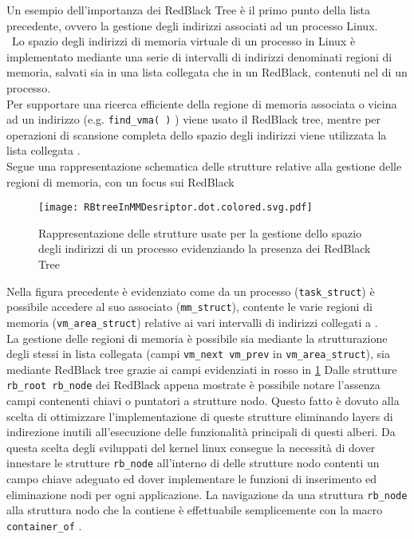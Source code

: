 \cite{lwnAgumentedRBtrees,lwnRBtrees}
\voidLine
\label{chSpMMAux:memRegionRBTree}
Un esempio dell'importanza dei RedBlack Tree è il primo punto della lista precedente,
ovvero la gestione degli indirizzi associati ad un processo Linux.\\\
Lo spazio degli indirizzi di memoria virtuale di un processo in Linux è implementato mediante una serie
di intervalli di indirizzi denominati regioni di memoria, salvati sia in una lista collegata che in un RedBlack, contenuti
nel \vvv{Memory Descriptor} di un processo.\\
Per supportare una ricerca efficiente della regione di memoria associata o vicina ad un indirizzo
(e.g. \verb|find_vma( )| ) viene usato il RedBlack tree, 
mentre per operazioni di scansione completa dello spazio degli indirizzi viene utilizzata la lista collegata
\cite{ulk}.\\
\voidLine
Segue una rappresentazione schematica delle strutture relative alla gestione delle regioni di memoria, con
un focus sui RedBlack 
\begin{figure}[H]
  \centering \texttt{[image: RBtreeInMMDesriptor.dot.colored.svg.pdf]}
  \caption[RedBlackTree nella gestione degli address space in Linux]
  {Rappresentazione delle strutture usate per la gestione dello spazio degli indirizzi di un processo
			evidenziando la presenza dei RedBlack Tree}
  \decoRule \label{fig:RBtreeInMMDesriptor}
\end{figure}
Nella figura precedente è evidenziato come da un processo (\verb|task_struct|) è possibile
accedere al suo \vvv{Memory Descriptor} associato (\verb|mm_struct|), contente le varie 
regioni di memoria (\verb|vm_area_struct|) relative ai vari intervalli di indirizzi 
collegati a \vvv{p}.\\
La gestione delle regioni di memoria è possibile sia mediante la strutturazione degli stessi 
in lista collegata (campi \verb|vm_next vm_prev| in \verb|vm_area_struct|),
sia mediante RedBlack tree grazie ai campi evidenziati in rosso in \ref{fig:RBtreeInMMDesriptor}
\voidLine
Dalle strutture \verb|rb_root rb_node| dei RedBlack appena mostrate è possibile notare l'assenza 
campi contenenti chiavi o puntatori a strutture nodo. 
Questo fatto è dovuto alla scelta di ottimizzare l'implementazione di queste strutture eliminando 
layers di indirezione inutili all'esecuzione delle funzionalità principali di questi alberi.
Da questa scelta degli sviluppati del kernel linux consegue la necessità di dover 
innestare le strutture \verb|rb_node| all'interno di delle strutture nodo contenti un campo chiave adeguato
ed dover implementare le funzioni di inserimento ed eliminazione nodi per ogni applicazione.
La navigazione da una struttura \verb|rb_node| alla struttura nodo che la contiene è effettuabile
semplicemente con la macro \verb|container_of| .\\%

